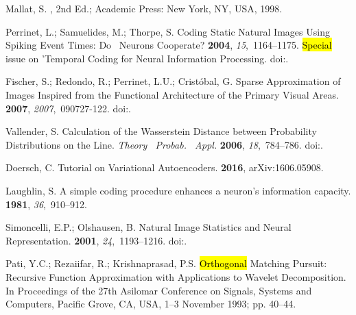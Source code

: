 \documentclass[vision,article,accept,oneauthor,pdftex]{Definitions/mdpi}
\begin{document}
\begin{thebibliography}{999}
Mallat, S.
, 2nd Ed.; Academic
  Press: New York, NY, USA,  1998.

Perrinet, L.; Samuelides, M.; Thorpe, S.
\newblock Coding Static Natural Images Using Spiking Event Times: Do~ Neurons
  Cooperate?
 {\bf 2004}, {\em
  15},~1164--1175.
\newblock \hl{Special} issue on 'Temporal Coding for Neural Information Processing.
  doi:{\href{https://doi.org/10.1109/TNN.2004.833303}{}}.

Fischer, S.; Redondo, R.; Perrinet, L.U.; Crist{\'o}bal, G.
\newblock Sparse Approximation of Images Inspired from the Functional
  Architecture of the Primary Visual Areas.
 {\bf 2007},
  {\em 2007},~090727-122.
\newblock
  doi:{\href{https://doi.org/10.1155/2007/90727}{}}.



Vallender, S.
\newblock Calculation of the {Wasserstein} Distance between Probability
  Distributions on the Line.
\newblock \emph{Theory~ Probab.~ Appl.} \textbf{2006}, {\em 18},~784--786.
\newblock
  doi:{\href{https://doi.org/10.1137/1118101}{}}.

Doersch, C.
\newblock Tutorial on Variational Autoencoders.
 {\bf 2016}, arXiv:1606.05908.

Laughlin, S.
\newblock A simple coding procedure enhances a neuron's information capacity.
 {\bf
  1981}, {\em 36},~910--912.

Simoncelli, E.P.; Olshausen, B.
\newblock Natural Image Statistics and Neural Representation.
 {\bf 2001}, {\em 24},~1193--1216.
\newblock
  doi:{\href{https://doi.org/10.1146/annurev.neuro.24.1.1193}{}}.
  
Pati, Y.C.; Rezaiifar, R.; Krishnaprasad, P.S.
\newblock \hl{Orthogonal} Matching Pursuit: Recursive Function Approximation with
  Applications to Wavelet Decomposition.
\newblock  In Proceedings of the  27th Asilomar Conference on Signals, Systems and Computers, Pacific Grove, CA, USA, 1--3 November 1993; pp. 40--44.

\end{thebibliography}
\end{document}
